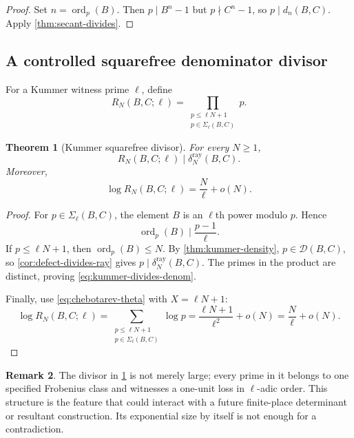 \documentclass[11pt]{article}
\newtheorem{theorem}{Theorem}[section]
\theoremstyle{definition}
\newtheorem{remark}[theorem]{Remark}
\newcommand{\ord}{\operatorname{ord}}
\newcommand{\Def}{\mathcal D}
\newcommand{\raydelta}{\delta^{\mathrm{ray}}}
\begin{document}
\begin{proof}
Set $n=\ord_p(B)$.  Then $p\mid B^n-1$ but $p\nmid C^n-1$, so $p\mid d_n(B,C)$.
Apply \cref{thm:secant-divides}.
\end{proof}

\subsection{A controlled squarefree denominator divisor}

For a Kummer witness prime $\ell$, define
\begin{equation}
 R_N(B,C;\ell)=
 \prod_{\substack{p\le\ell N+1\\p\in\Sigma_\ell(B,C)}}p.
 \label{eq:kummer-divisor}
\end{equation}

\begin{theorem}[Kummer squarefree divisor]
\label{thm:kummer-denominator}
For every $N\ge1$,
\begin{equation}
 R_N(B,C;\ell)\mid\raydelta_N(B,C).
 \label{eq:kummer-divides-denom}
\end{equation}
Moreover,
\begin{equation}
 \log R_N(B,C;\ell)=\frac{N}{\ell}+o(N).
 \label{eq:kummer-divisor-asymp}
\end{equation}
\end{theorem}

\begin{proof}
For $p\in\Sigma_\ell(B,C)$, the element $B$ is an $\ell$th power modulo $p$.  Hence
\[
 \ord_p(B)\mid\frac{p-1}{\ell}.
\]
If $p\le\ell N+1$, then $\ord_p(B)\le N$.  By
\cref{thm:kummer-density}, $p\in\Def(B,C)$, so
\cref{cor:defect-divides-ray} gives $p\mid\raydelta_N(B,C)$.  The primes in the product are
distinct, proving \eqref{eq:kummer-divides-denom}.

Finally, use \eqref{eq:chebotarev-theta} with $X=\ell N+1$:
\[
 \log R_N(B,C;\ell)
 =\sum_{\substack{p\le\ell N+1\\p\in\Sigma_\ell(B,C)}}\log p
 =\frac{\ell N+1}{\ell^2}+o(N)
 =\frac N\ell+o(N).
\]
\end{proof}

\begin{remark}
The divisor in \cref{thm:kummer-denominator} is not merely large; every prime in it belongs
to one specified Frobenius class and witnesses a one-unit loss in $\ell$-adic order.  This
structure is the feature that could interact with a future finite-place determinant or
resultant construction.  Its exponential size by itself is not enough for a contradiction.
\end{remark}
\end{document}
